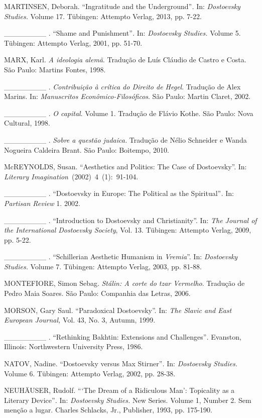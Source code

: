 MARTINSEN, Deborah. ``Ingratitude and the Underground''\emph{.} In:
\emph{Dostoevsky Studies.} Volume 17. Tübingen: Attempto Verlag, 2013,
pp. 7-22.

\_\_\_\_\_\_\_\_ . ``Shame and Punishment''\emph{.} In: \emph{Dostoevsky
Studies.} Volume 5. Tübingen: Attempto Verlag, 2001, pp. 51-70.

MARX, Karl. \emph{A ideologia alemã}. Tradução de Luís Cláudio de Castro
e Costa. São Paulo: Martins Fontes, 1998.

\_\_\_\_\_\_\_\_ . \emph{Contribuição à crítica do Direito de Hegel}.
Tradução de Alex Marins. In: \emph{Manuscritos Econômico-Filosóficos}.
São Paulo: Martin Claret, 2002.

\_\_\_\_\_\_\_\_ . \emph{O capital}. Volume 1. Tradução de Flávio Kothe.
São Paulo: Nova Cultural, 1998.

\_\_\_\_\_\_\_\_ . \emph{Sobre a questão judaica.} Tradução de Nélio
Schneider e Wanda Nogueira Caldeira Brant. São Paulo: Boitempo, 2010.

McREYNOLDS, Susan. ``Aesthetics and Politics: The Case of Dostoevsky''.
In: \emph{Literary Imagination}~(2002)~4~(1):~91-104.

\_\_\_\_\_\_\_\_ . ``Dostoevsky in Europe: The Political as the
Spiritual''\emph{.} In: \emph{Partisan Review} 1. 2002.

\_\_\_\_\_\_\_\_ . ``Introduction to Dostoevsky and Christianity''. In:
\emph{The Journal of the International Dostoevsky Society}, Vol. 13.
Tübingen: Attempto Verlag, 2009, pp. 5-22.

\_\_\_\_\_\_\_\_ . ``Schillerian Aesthetic Humanism in \emph{Vremia}''.
In: \emph{Dostoevsky Studies.} Volume 7. Tübingen: Attempto Verlag,
2003, pp. 81-88.

MONTEFIORE, Simon Sebag. \emph{Stálin: A corte do tzar Vermelho}.
Tradução de Pedro Maia Soares. São Paulo: Companhia das Letras, 2006.

MORSON, Gary Saul. ``Paradoxical Dostoevsky''. In: \emph{The Slavic and
East European Journal,} Vol. 43, No. 3, Autumn, 1999.

\_\_\_\_\_\_\_\_ . ``Rethinking Bakhtin: Extensions and
Challenges''\emph{.} Evanston, Illinois: Northwestern University Press,
1986.

NATOV, Nadine. ``Dostoevsky versus Max Stirner''\emph{.} In:
\emph{Dostoevsky Studies.} Volume 6. Tübingen: Attempto Verlag, 2002,
pp. 28-38.

NEUHÄUSER, Rudolf. ```The Dream of a Ridiculous Man': Topicality as a
Literary Device''\emph{.} In: \emph{Dostoevsky Studies.} New Series.
Volume 1, Number 2. Sem menção a lugar. Charles Schlacks, Jr.,
Publisher, 1993, pp. 175-190.

